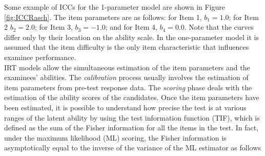 {%
Some example of ICCs for the 1-parameter model are shown in Figure \ref{fig:ICCRasch}. The item parameters are as follows: for Item 1, $b_1 = 1.0$; for Item 2 $b_2 = 2.0$; for Item 3, $b_3 = -1.0$; and for Item 4, $b_4= 0.0$. Note that the curves differ only by their location on the ability scale. In the one-parameter model it is assumed that the item difficulty is the only item characteristic that influences examinee performance.\\
IRT models allow the simultaneous estimation of the item parameters and the examinees' abilities. The \textit{calibration} process usually involves the estimation of item parameters from pre-test response data. The \textit{scoring} phase deals with the estimation of the ability scores of the candidates. Once the item parameters have been estimated, it is possible to understand how precise the test is at various ranges of the latent ability by using the test information function (TIF), which is defined as the sum of the Fisher information for all the items in the test. In fact, under the maximum likelihood (ML) scoring, the Fisher information is asymptotically equal to the inverse of the variance of the ML estimator as follows
}
